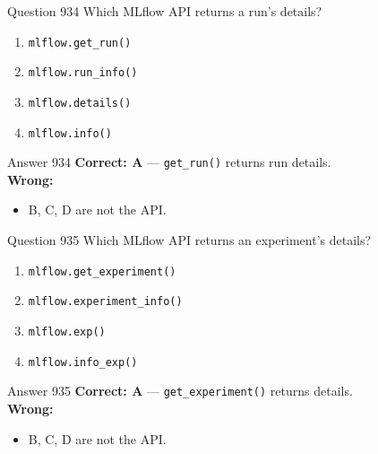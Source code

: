 \documentclass[aspectratio=169,11pt]{beamer}
\begin{document}
	\begin{frame}{Question 934}
		Which MLflow API returns a run's details?
		\begin{enumerate}[label=\Alph*.]
			\item \texttt{mlflow.get\_run()}
			\item \texttt{mlflow.run\_info()}
			\item \texttt{mlflow.details()}
			\item \texttt{mlflow.info()}
		\end{enumerate}
	\end{frame}
	\begin{frame}{Answer 934}
		\textbf{Correct: A} --- \texttt{get\_run()} returns run details.\\
		\vspace{0.5em}
		\textbf{Wrong:}
		\begin{itemize}
			\item B, C, D are not the API.
		\end{itemize}
	\end{frame}
	
	\begin{frame}{Question 935}
		Which MLflow API returns an experiment's details?
		\begin{enumerate}[label=\Alph*.]
			\item \texttt{mlflow.get\_experiment()}
			\item \texttt{mlflow.experiment\_info()}
			\item \texttt{mlflow.exp()}
			\item \texttt{mlflow.info\_exp()}
		\end{enumerate}
	\end{frame}
	\begin{frame}{Answer 935}
		\textbf{Correct: A} --- \texttt{get\_experiment()} returns details.\\
		\vspace{0.5em}
		\textbf{Wrong:}
		\begin{itemize}
			\item B, C, D are not the API.
		\end{itemize}
	\end{frame}
	
\end{document}
